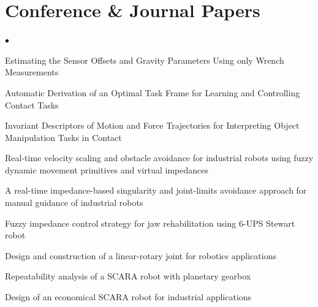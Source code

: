 \documentclass[lighthipster]{simplehipstercv}
\begin{document}
	\section*{Conference \& Journal Papers}
	\begin{minipage}{\textwidth}
		\begin{list}{$\bullet$}{%
				\setlength{\leftmargin}{10pt}    %
				\setlength{\labelwidth}{1em}    %
				\setlength{\labelsep}{0.5em}    %
				\setlength{\itemsep}{0pt}       %
				\setlength{\parsep}{0pt}
				\setlength{\topsep}{0pt}
				\setlength{\partopsep}{0pt}
			}
			\item Estimating the Sensor Offsets and Gravity Parameters Using only Wrench Measurements
			
			\item Automatic Derivation of an Optimal Task Frame for Learning and Controlling Contact Tasks
			
			\item Invariant Descriptors of Motion and Force Trajectories for Interpreting Object Manipulation Tasks in Contact
			
			\item Real-time velocity scaling and obstacle avoidance for industrial robots using fuzzy dynamic movement primitives and virtual impedances
			
			\item A real-time impedance-based singularity and joint-limits avoidance approach for manual guidance of industrial robots
			
			\item Fuzzy impedance control strategy for jaw rehabilitation using 6-UPS Stewart robot
			
			\item Design and construction of a linear-rotary joint for robotics applications
			
			\item Repeatability analysis of a SCARA robot with planetary gearbox
			
			\item Design of an economical SCARA robot for industrial applications
		\end{list}
	\end{minipage}
\end{document}
